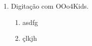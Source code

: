 \begin{enumerate}
	\item Digitação com OOo4Kids.
	\begin{enumerate}
		\item asdfg
		\item çlkjh
	\end{enumerate}
\end{enumerate}

